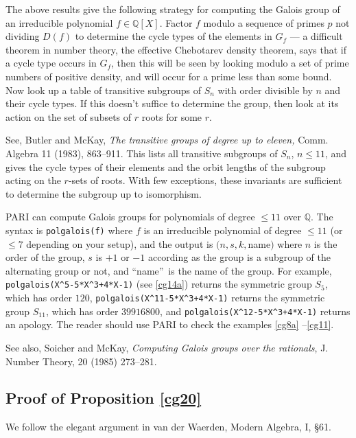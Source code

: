 \documentclass[a4paper,11pt,final,openany]{memoir}
\theoremstyle{nonumberplain}
\begin{document}
The above results give the following strategy for computing the Galois group
of an irreducible polynomial $f\in\mathbb{Q}[X]$. Factor $f$ modulo a sequence
of primes $p$ not dividing $D(f)$ to determine the cycle types of the elements
in $G_{f}$ --- a difficult theorem in number theory, the effective Chebotarev
density theorem, says that if a cycle type occurs in $G_{f}$, then this will
be seen by looking modulo a set of prime numbers of positive density, and will
occur for a prime less than some bound. Now look up a table of transitive
subgroups of $S_{n}$ with order divisible by $n$ and their cycle types. If
this doesn't suffice to determine the group, then look at its action on the
set of subsets of $r$ roots for some $r$.

See, Butler and McKay, \textit{The transitive groups of degree up to
eleven}\emph{,\/} Comm. Algebra 11 (1983), 863--911. This lists all transitive
subgroups of $S_{n}$, $n\leq11$, and gives the cycle types of their elements
and the orbit lengths of the subgroup acting on the $r$-sets of roots. With
few exceptions, these invariants are sufficient to determine the subgroup up
to isomorphism.

PARI%
can compute Galois groups for polynomials of degree $\leq11$ over $\mathbb{Q}%
$. The syntax is \verb|polgalois(f)| where $f$ is an irreducible polynomial of
degree $\leq11$ (or $\leq7$ depending on your setup), and the output is
$(n,s,k,$name$)$ where $n$ is the order of the group, $s$ is $+1$ or $-1$
according as the group is a subgroup of the alternating group or not, and
\textquotedblleft name\textquotedblright\ is the name of the group. For
example, \verb|polgalois(X^5-5*X^3+4*X-1)| (see \ref{cg14a}) returns the
symmetric group $S_{5}$, which has order $120$,
\verb|polgalois(X^11-5*X^3+4*X-1)| returns the symmetric group $S_{11}$, which
has order $39916800$, and \newline\verb|polgalois(X^12-5*X^3+4*X-1)| returns
an apology. The reader should use PARI to check the examples \ref{cg8a}%
--\ref{cg11}.

See also, Soicher and McKay, \textit{Computing Galois groups over the
rationals}, J. Number Theory, 20 (1985) 273--281.

\subsection{Proof of Proposition \ref{cg20}}

We follow the elegant argument in van der Waerden, Modern Algebra, I, \S 61.
\end{document}
